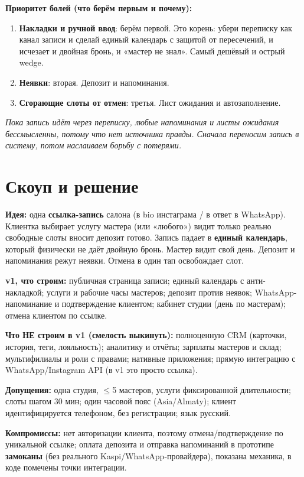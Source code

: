 \documentclass[11pt,a4paper]{article}
\newcommand{\arr}{\textrightarrow{}}
\begin{document}
\textbf{Приоритет болей (что берём первым и почему):}
\begin{enumerate}
  \item \textbf{Накладки и ручной ввод}: берём первой. Это корень: убери переписку как канал записи и сделай единый календарь с защитой от пересечений, и исчезает и двойная бронь, и «мастер не знал». Самый дешёвый и острый wedge.
  \item \textbf{Неявки}: вторая. Депозит и напоминания.
  \item \textbf{Сгорающие слоты от отмен}: третья. Лист ожидания и автозаполнение.
\end{enumerate}

\textit{Пока запись идёт через переписку, любые напоминания и листы ожидания бессмысленны, потому что нет источника правды. Сначала переносим запись в систему, потом наслаиваем борьбу с потерями.}

\section{Скоуп и решение}

\textbf{Идея:} одна \textbf{ссылка-запись} салона (в bio инстаграма / в ответ в WhatsApp). Клиентка выбирает услугу \arr{} мастера (или «любого») \arr{} видит только реально свободные слоты \arr{} вносит депозит \arr{} готово. Запись падает в \textbf{единый календарь}, который физически не даёт двойную бронь. Мастер видит свой день. Депозит и напоминания режут неявки. Отмена в один тап освобождает слот.

\textbf{v1, что строим:} публичная страница записи; единый календарь с анти-накладкой; услуги и рабочие часы мастеров; депозит против неявок; WhatsApp-напоминание и подтверждение клиентом; кабинет студии (день по мастерам); отмена клиентом по ссылке.

\textbf{Что НЕ строим в v1 (смелость выкинуть):} полноценную CRM (карточки, история, теги, лояльность); аналитику и отчёты; зарплаты мастеров и склад; мультифилиалы и роли с правами; нативные приложения; прямую интеграцию с WhatsApp/Instagram API (в v1 это просто ссылка).

\textbf{Допущения:} одна студия, $\leq$5 мастеров, услуги фиксированной длительности; слоты шагом 30 мин; один часовой пояс (Asia/Almaty); клиент идентифицируется телефоном, без регистрации; язык русский.

\textbf{Компромиссы:} нет авторизации клиента, поэтому отмена/подтверждение по уникальной ссылке; оплата депозита и отправка напоминаний в прототипе \textbf{замоканы} (без реального Kaspi/WhatsApp-провайдера), показана механика, в коде помечены точки интеграции.
\end{document}
